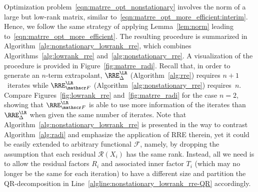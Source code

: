 Optimization problem~\eqref{eqn:matrre_opt_nonstationary} involves the norm of a large but low-rank matrix,
similar to~\eqref{eqn:matrre_opt_more_efficient:interim}.
Hence, we follow the same strategy of applying Lemma~\ref{lem:norm} leading to~\eqref{eqn:matrre_opt_more_efficient}.
The resulting procedure is summarized in Algorithm~\ref{alg:nonstationary_lowrank_rre},
which combines Algorithms~\ref{alg:lowrank_rre} and~\ref{alg:nonstationary_rre}.
A visualization of the procedure is provided in Figure~\ref{fig:matrre_radi}.
Recall that, in order to generate an $n$-term extrapolant,
$\RRE_{\Delta}^{\LR}$ (Algorithm~\ref{alg:rre}) requires $n+1$~iterates while
$\RRE_{\mathscr F}^{\LR}$ (Algorithm~\ref{alg:nonstationary_rre}) requires~$n$.
Compare Figures~\ref{fig:lowrank_rre} and~\ref{fig:matrre_radi} for the case $n=2$,
showing that $\RRE_{\mathscr F}^{\LR}$ is able to use more information of the iterates than $\RRE_{\Delta}^{\LR}$ when given the same number of iterates.
Note that Algorithm~\ref{alg:nonstationary_lowrank_rre} is presented in the way to contrast Algorithm~\ref{alg:radi} and emphasize the application of \ac{RRE} therein, yet it could be easily extended to arbitrary functional $\mathscr F$,
namely, by dropping the assumption that each residual $\mathscr R(X_i)$ has the same rank.
Instead, all we need is to allow the residual factors $R_i$ and associated inner factor $T_i$
(which may no longer be the same for each iteration)
to have a different size and partition the QR-decomposition in Line~\ref{algline:nonstationary_lowrank_rre-QR} accordingly.

